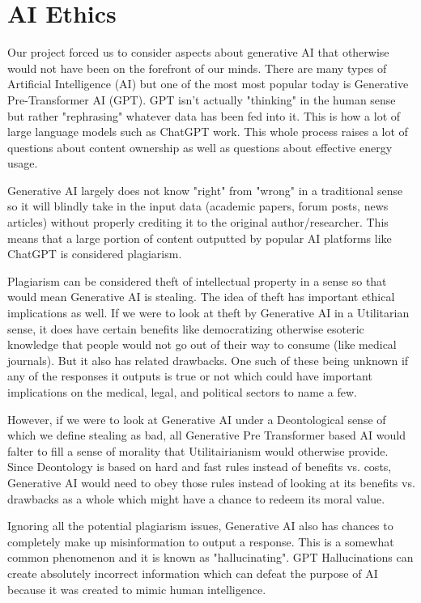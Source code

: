 \documentclass[letterpaper,11pt,leqno]{article}
\begin{document}
\section{AI Ethics}

Our project forced us to consider aspects about generative AI that otherwise would not have been on the forefront of our minds. There are many types of Artificial Intelligence (AI) but one of the most most popular today is Generative Pre-Transformer AI (GPT). GPT isn't actually "thinking" in the human sense but rather "rephrasing" whatever data has been fed into it. This is how a lot of large language models such as ChatGPT work. This whole process raises a lot of questions about content ownership as well as questions about effective energy usage.

Generative AI largely does not know "right" from "wrong" in a traditional sense so it will blindly take in the input data (academic papers, forum posts, news articles) without properly crediting it to the original author/researcher. This means that a large portion of content outputted by popular AI platforms like ChatGPT is considered plagiarism.

Plagiarism can be considered theft of intellectual property in a sense so that would mean Generative AI is stealing. The idea of theft has important ethical implications as well. If we were to look at theft by Generative AI in a Utilitarian sense, it does have certain benefits like democratizing otherwise esoteric knowledge that people would not go out of their way to consume (like medical journals). But it also has related drawbacks. One such of these being unknown if any of the responses it outputs is true or not which could have important implications on the medical, legal, and political sectors to name a few.

However, if we were to look at Generative AI under a Deontological sense of which we define stealing as bad, all Generative Pre Transformer based AI would falter to fill a sense of morality that Utilitairianism would otherwise provide. Since Deontology is based on hard and fast rules instead of benefits vs. costs, Generative AI would need to obey those rules instead of looking at its benefits vs. drawbacks as a whole which might have a chance to redeem its moral value.

Ignoring all the potential plagiarism issues, Generative AI also has chances to completely make up misinformation to output a response. This is a somewhat common phenomenon and it is known as "hallucinating". GPT Hallucinations can create absolutely incorrect information which can defeat the purpose of AI because it was created to mimic human intelligence.
\end{document}
